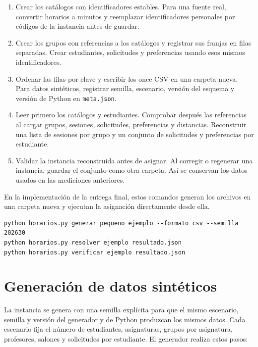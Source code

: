 \documentclass[11pt]{article}
\numberwithin{equation}{section}
\numberwithin{figure}{section}
\numberwithin{table}{section}
\theoremstyle{definition}
\begin{document}
\begin{enumerate}
  \item Crear los catálogos con identificadores estables. Para una fuente
        real, convertir horarios a minutos y reemplazar identificadores
        personales por códigos de la instancia antes de guardar.
  \item Crear los grupos con referencias a los catálogos y registrar sus
        franjas en filas separadas. Crear estudiantes, solicitudes y
        preferencias usando esos mismos identificadores.
  \item Ordenar las filas por clave y escribir los once CSV en una carpeta
        nueva. Para datos sintéticos, registrar semilla, escenario, versión
        del esquema y versión de Python en \texttt{meta.json}.
  \item Leer primero los catálogos y estudiantes. Comprobar después las
        referencias al cargar grupos, sesiones, solicitudes, preferencias
        y distancias. Reconstruir una lista de sesiones por grupo y un
        conjunto de solicitudes y preferencias por estudiante.
  \item Validar la instancia reconstruida antes de asignar. Al corregir o
        regenerar una instancia, guardar el conjunto como otra carpeta.
        Así se conservan los datos usados en las mediciones anteriores.
\end{enumerate}

En la implementación de la entrega final, estos comandos generan los archivos
en una carpeta nueva y ejecutan la asignación directamente desde ella.

\begin{verbatim}
python horarios.py generar pequeno ejemplo --formato csv --semilla 202630
python horarios.py resolver ejemplo resultado.json
python horarios.py verificar ejemplo resultado.json
\end{verbatim}

\section{Generación de datos sintéticos}

La instancia se genera con una semilla explícita para que el mismo escenario,
semilla y versión del generador y de Python produzcan los mismos datos. Cada
escenario fija el número de estudiantes, asignaturas, grupos por asignatura,
profesores, salones y solicitudes por estudiante. El generador realiza estos
pasos:
\end{document}
